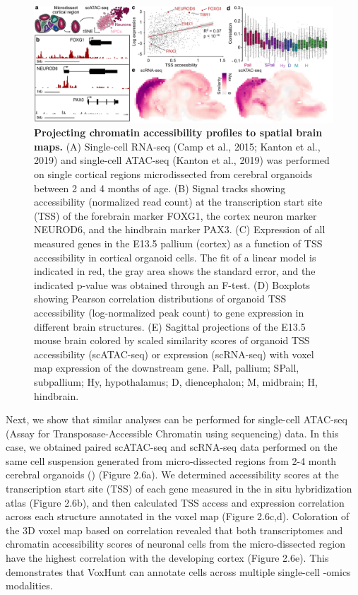 \begin{figure}[b!]
    \centering
	\includegraphics[width=\textwidth]{figures/voxhunt/Figure_6}
    \caption{\textbf{Projecting chromatin accessibility profiles to spatial brain maps.} (A) Single-cell RNA-seq (Camp et al., 2015; Kanton et al., 2019) and single-cell ATAC-seq (Kanton et al., 2019) was performed on single cortical regions microdissected from cerebral organoids between 2 and 4 months of age. (B) Signal tracks showing accessibility (normalized read count) at the transcription start site (TSS) of the forebrain marker FOXG1, the cortex neuron marker NEUROD6, and the hindbrain marker PAX3. (C) Expression of all measured genes in the E13.5 pallium (cortex) as a function of TSS accessibility in cortical organoid cells. The fit of a linear model is indicated in red, the gray area shows the standard error, and the indicated p-value was obtained through an F-test. (D) Boxplots showing Pearson correlation distributions of organoid TSS accessibility (log-normalized peak count) to gene expression in different brain structures. (E) Sagittal projections of the E13.5 mouse brain colored by scaled similarity scores of organoid TSS accessibility (scATAC-seq) or expression (scRNA-seq) with voxel map expression of the downstream gene. Pall, pallium; SPall, subpallium; Hy, hypothalamus; D, diencephalon; M, midbrain; H, hindbrain.}
    \label{fig:vox6}
\end{figure}



Next, we show that similar analyses can be performed for single-cell ATAC-seq (Assay for Transposase-Accessible Chromatin using sequencing) data. In this case, we obtained paired scATAC-seq and scRNA-seq data performed on the same cell suspension generated from micro-dissected regions from 2-4 month cerebral organoids (\cite{kanton_organoid_2019}) (Figure 2.6a). We determined accessibility scores at the transcription start site (TSS) of each gene measured in the in situ hybridization atlas (Figure 2.6b), and then calculated TSS access and expression correlation across each structure annotated in the voxel map (Figure 2.6c,d). Coloration of the 3D voxel map based on correlation revealed that both transcriptomes and chromatin accessibility scores of neuronal cells from the micro-dissected region have the highest correlation with the developing cortex (Figure 2.6e). This demonstrates that VoxHunt can annotate cells across multiple single-cell -omics modalities.

